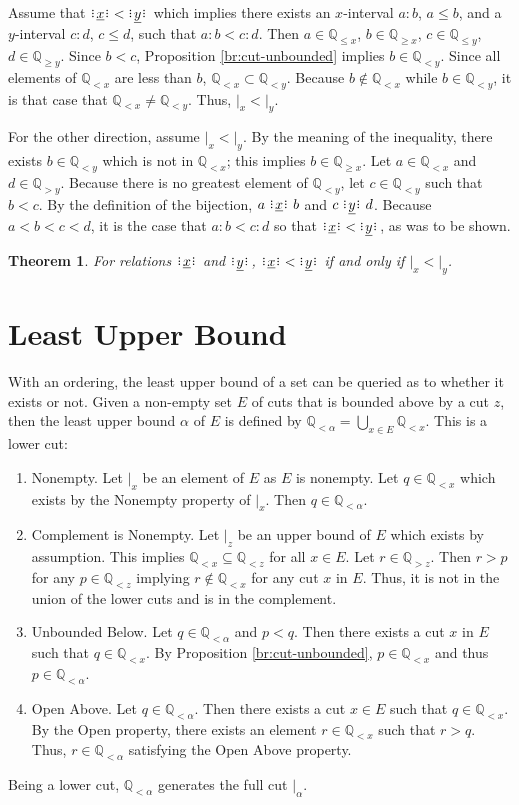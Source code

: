 \documentclass[12pt]{article}
\newtheorem{theorem}{Theorem}
\newcommand{\qcut}[2][x]{\ensuremath{\mathbb{Q}_{#2 #1}}}
\newcommand{\qlt}[1][x]{\qcut[#1]{<}}
\newcommand{\qgt}[1][x]{\qcut[#1]{>}}
\newcommand{\qgeq}[1][x]{\qcut[#1]{\geq}}
\newcommand{\qleq}[1][x]{\qcut[#1]{\leq}}
\newcommand{\cut}[1][x]{{\vert}_{#1} }
\newcommand{\yrel}{\xrel[y]}
\begin{document}
Assume that $\xrel  \:<\: \yrel$ which implies there exists an $x$-interval $a:b$, $a \leq b$,  and a $y$-interval $c:d$, $c \leq d$, such that $a:b < c:d$. Then $a \in \qleq$, $b \in \qgeq$, $c \in \qleq[y]$, $d \in \qgeq[y]$. Since $ b< c$, Proposition \ref{br:cut-unbounded} implies $b \in \qlt[y]$. Since all elements of $\qlt$ are less than $b$, $\qlt \subset \qlt[y]$. Because $b\notin \qlt$ while $b \in \qlt[y]$, it is that case that $\qlt \neq \qlt[y]$. Thus,  $\cut < \cut[y]$. 

For the other direction, assume $\cut < \cut[y]$. By the meaning of the inequality, there exists $b \in \qlt[y]$ which is not in $\qlt$; this implies $b \in \qgeq$. Let $a \in \qlt$ and $d \in \qgt[y]$.  Because there is no greatest element of $\qlt[y]$, let $c\in \qlt[y]$ such that $b < c$. By the definition of the bijection,  $a \xrel b$ and $c \yrel d$. Because $a < b < c < d$, it is the case that $a:b < c:d$ so that $\xrel  \:<\: \yrel$, as was to be shown. 

\begin{theorem}
For relations $\xrel$ and $\yrel$, $\xrel  \:<\: \yrel$ if and only if $\cut < \cut[y]$.
\end{theorem}

\section{Least Upper Bound}

With an ordering, the least upper bound of a set can be queried as to whether it exists or not. Given a non-empty set $E$ of cuts that is bounded above by a cut $z$, then the least upper bound $\alpha$ of $E$ is defined by $\qlt[\alpha] = \bigcup_{x \in E} \qlt$. This is a lower cut: 
\begin{enumerate}
    \item Nonempty. Let $\cut$ be an element of $E$ as $E$ is nonempty. Let $q \in \qlt$ which exists by the Nonempty property of $\cut$. Then $q \in \qlt[\alpha]$.
    \item Complement is Nonempty. Let $\cut[z]$ be an upper bound of $E$ which exists by assumption. This implies $\qlt \subseteq \qlt[z]$ for all $x \in E$. Let $r \in \qgt[z]$. Then $r > p$ for any $p \in \qlt[z]$ implying $r \notin \qlt[x]$ for any cut $x$ in $E$. Thus, it is not in the union of the lower cuts and is in the complement. 
    \item Unbounded Below. Let $q \in \qlt[\alpha]$ and $p < q$. Then there exists a cut $x$ in $E$ such that $q \in \qlt$. By Proposition \ref{br:cut-unbounded}, $p \in \qlt$ and thus $p \in \qlt[\alpha]$.
    \item Open Above. Let $q \in \qlt[\alpha]$. Then there exists a cut $x \in E$ such that $q \in \qlt$. By the Open property, there exists an element $r \in \qlt$ such that $r > q$. Thus, $r \in \qlt[\alpha]$ satisfying the Open Above property. 
\end{enumerate}
Being a lower cut, $\qlt[\alpha]$ generates the full cut $\cut[\alpha]$.
\end{document}
